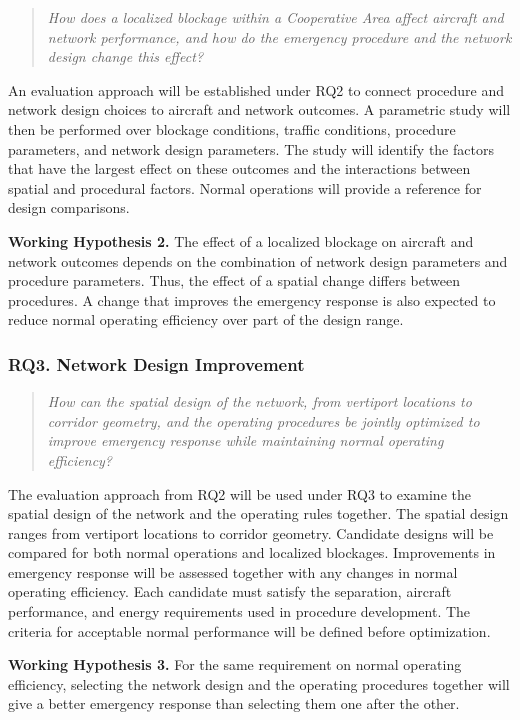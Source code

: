 \documentclass[11pt,letterpaper]{article}
\newcommand{\hypothesis}[2]{\par\noindent\textbf{Working Hypothesis #1.} #2\par}
\begin{document}
\begin{quote}
\textit{How does a localized blockage within a Cooperative Area affect aircraft and network performance, and how do the emergency procedure and the network design change this effect?}
\end{quote}

An evaluation approach will be established under RQ2 to connect procedure and network design choices to aircraft and network outcomes. A parametric study will then be performed over blockage conditions, traffic conditions, procedure parameters, and network design parameters. The study will identify the factors that have the largest effect on these outcomes and the interactions between spatial and procedural factors. Normal operations will provide a reference for design comparisons.

\hypothesis{2}{The effect of a localized blockage on aircraft and network outcomes depends on the combination of network design parameters and procedure parameters. Thus, the effect of a spatial change differs between procedures. A change that improves the emergency response is also expected to reduce normal operating efficiency over part of the design range.}

\subsubsection{RQ3. Network Design Improvement}
\label{sec:rq3}

\begin{quote}
\textit{How can the spatial design of the network, from vertiport locations to corridor geometry, and the operating procedures be jointly optimized to improve emergency response while maintaining normal operating efficiency?}
\end{quote}

The evaluation approach from RQ2 will be used under RQ3 to examine the spatial design of the network and the operating rules together. The spatial design ranges from vertiport locations to corridor geometry. Candidate designs will be compared for both normal operations and localized blockages. Improvements in emergency response will be assessed together with any changes in normal operating efficiency. Each candidate must satisfy the separation, aircraft performance, and energy requirements used in procedure development. The criteria for acceptable normal performance will be defined before optimization.

\hypothesis{3}{For the same requirement on normal operating efficiency, selecting the network design and the operating procedures together will give a better emergency response than selecting them one after the other.}
\end{document}
